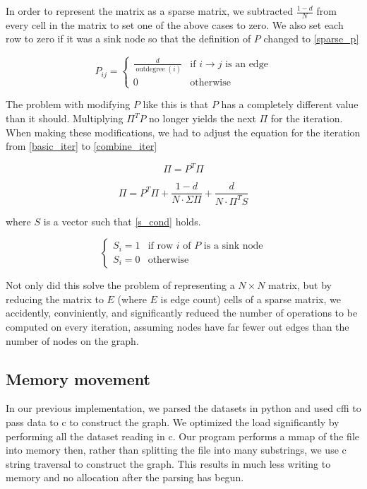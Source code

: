 \documentclass[draft]{report}
\begin{document}
In order to represent the matrix as a sparse matrix, we subtracted $\frac{1-d}{N}$ from every cell in the matrix to set one of the above cases to zero. We also set each row to zero if it was a sink node so that the definition of $P$ changed to \vref{sparse_p}

\begin{equation}
\label{sparse_p}
P_{ij} = 
\begin{cases}
\frac{d}{\operatorname{outdegree}(i)}                   & \text{if $i\rightarrow j$ is an edge}\\
0                                                        & \text{otherwise}
\end{cases}
\end{equation}

The problem with modifying $P$ like this is that $P$ has a completely different value than it should. Multiplying $\Pi^T P$ no longer yields the next $\Pi$ for the iteration. When making these modifications, we had to adjust the equation for the iteration from \vref{basic_iter} to \vref{combine_iter}

\begin{equation}
\label{basic_iter}
  \Pi = P^T \Pi
\end{equation}

\begin{equation}
\label{combine_iter}
  \Pi = P^T \Pi + \frac{1-d}{N\cdot \Sigma \Pi} + \frac{d}{N \cdot \Pi^T S}
\end{equation}

where $S$ is a vector such that \vref{s_cond} holds.

\begin{equation}
\label{s_cond}
  \begin{cases}
    S_i = 1 & \text{if row $i$ of $P$ is a sink node}\\
    S_i = 0 & \text{otherwise}
  \end{cases}
\end{equation}

Not only did this solve the problem of representing a $N\times N$ matrix, but by reducing the matrix to $E$ (where $E$ is edge count) cells of a sparse matrix, we accidently, conviniently, and significantly reduced the number of operations to be computed on every iteration, assuming nodes have far fewer out edges than the number of nodes on the graph.

\subsection{Memory movement}
In our previous implementation, we parsed the datasets in python and used cffi to pass data to c to construct the graph. We optimized the load significantly by performing all the dataset reading in c. Our program performs a mmap of the file into memory then, rather than splitting the file into many substrings, we use c string traversal to construct the graph. This results in much less writing to memory and no allocation after the parsing has begun.
\end{document}
